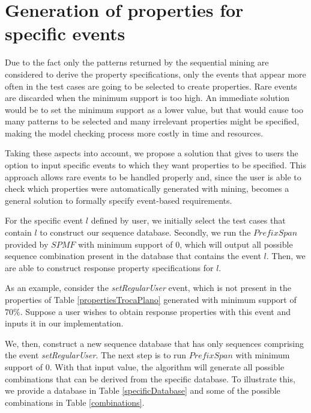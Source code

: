 \section{Generation of properties for specific events}
\label{sec-genpropspecific}

Due to the fact only the patterns returned by the sequential mining are considered to derive the property specifications, only the events that appear more often in the test cases are going to be selected to create properties. Rare events are discarded when the minimum support is too high. An immediate solution would be to set the minimum support as a lower value, but that would cause too many patterns to be selected and many irrelevant properties might be specified, making the model checking process more costly in time and resources.

Taking these aspects into account, we propose a solution that gives to users the option to input specific events to which they want properties to be specified. This approach allows rare events to be handled properly and, since the user is able to check which properties were automatically generated with mining, becomes a general solution to formally specify event-based requirements.

For the specific event $l$ defined by user, we initially select the test cases that contain $l$ to construct our sequence database. Secondly, we run the $PrefixSpan$ provided by $SPMF$ with minimum support of $0$, which will output all possible sequence combination present in the database that contains the event $l$. Then, we are able to construct response property specifications for $l$.

As an example, consider the \textit{setRegularUser} event, which is not present in the properties of Table \ref{propertiesTrocaPlano} generated with minimum support of $70\%$. Suppose a user wishes to obtain response properties with this event and inputs it in our implementation.

We, then, construct a new sequence database that has only sequences comprising the event \textit{setRegularUser}. The next step is to run $PrefixSpan$ with minimum support of 0. With that input value, the algorithm will generate all possible combinations that can be derived from the specific database. To illustrate this, we provide a database in Table \ref{specificDatabase} and some of the possible combinations in Table \ref{combinations}.

